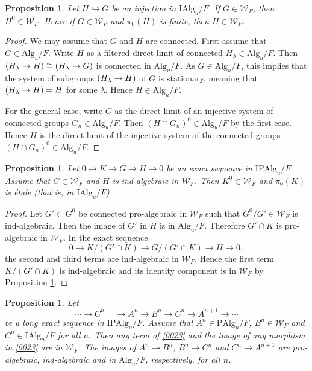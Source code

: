 \documentclass{amsart}
\newtheorem{Prop}[Thm]{Proposition}
\theoremstyle{remark}
\numberwithin{equation}{section}
\newcommand{\into}{\hookrightarrow}
\newcommand{\Alg}{\mathrm{Alg}}
\newcommand{\Ind}{\mathrm{I}}
\newcommand{\Pro}{\mathrm{P}}
\let\Im\relax
\DeclareMathOperator{\Im}{Im}
\begin{document}
\begin{Prop} \label{0048}
	Let $H \into G$ be an injection in $\Ind \Alg_{u} / F$.
	If $G \in \mathcal{W}_{F}$, then $H^{0} \in \mathcal{W}_{F}$.
	Hence if $G \in \mathcal{W}_{F}$ and $\pi_{0}(H)$ is finite,
	then $H \in \mathcal{W}_{F}$.
\end{Prop}

\begin{proof}
	We may assume that $G$ and $H$ are connected.
	First assume that $G \in \Alg_{u} / F$.
	Write $H$ as a filtered direct limit of connected $H_{\lambda} \in \Alg_{u} / F$.
	Then $\Im(H_{\lambda} \to H) \cong \Im(H_{\lambda} \to G)$ is connected in $\Alg_{u} / F$.
	As $G \in \Alg_{u} / F$, this implies that
	the system of subgroups $\Im(H_{\lambda} \to H)$ of $G$ is stationary,
	meaning that $\Im(H_{\lambda} \to H) = H$ for some $\lambda$.
	Hence $H \in \Alg_{u} / F$.
	
	For the general case, write $G$ as the direct limit of an injective system of
	connected groups $G_{n} \in \Alg_{u} / F$.
	Then $(H \cap G_{n})^{0} \in \Alg_{u} / F$ by the first case.
	Hence $H$ is the direct limit of the injective system of
	the connected groups $(H \cap G_{n})^{0} \in \Alg_{u} / F$.
\end{proof}

\begin{Prop} \label{0049}
	Let $0 \to K \to G \to H \to 0$ be an exact sequence in $\Ind \Pro \Alg_{u} / F$.
	Assume that $G \in \mathcal{W}_{F}$ and $H$ is ind-algebraic in $\mathcal{W}_{F}$.
	Then $K^{0} \in \mathcal{W}_{F}$ and $\pi_{0}(K)$ is \'etale
	(that is, in $\Ind \Alg_{u} / F$).
\end{Prop}

\begin{proof}
	Let $G' \subset G^{0}$ be connected pro-algebraic in $\mathcal{W}_{F}$
	such that $G^{0} / G' \in \mathcal{W}_{F}$ is ind-algebraic.
	Then the image of $G'$ in $H$ is in $\Alg_{u} / F$.
	Therefore $G' \cap K$ is pro-algebraic in $\mathcal{W}_{F}$.
	In the exact sequence
		\[
				0
			\to
				K / (G' \cap K)
			\to
				G / (G' \cap K)
			\to
				H
			\to
				0,
		\]
	the second and third terms are ind-algebraic in $\mathcal{W}_{F}$.
	Hence the first term $K / (G' \cap K)$ is ind-algebraic
	and its identity component is in $\mathcal{W}_{F}$
	by Proposition \ref{0048}.
\end{proof}

\begin{Prop} \label{0041}
	Let
		\begin{equation} \label{0023}
				\cdots
			\to
				C^{n - 1}
			\to
				A^{n}
			\to
				B^{n}
			\to
				C^{n}
			\to
				A^{n + 1}
			\to
				\cdots
		\end{equation}
	be a long exact sequence in $\Ind \Pro \Alg_{u} / F$.
	Assume that $A^{n} \in \Pro \Alg_{u} / F$,
	$B^{n} \in \mathcal{W}_{F}$ and
	$C^{n} \in \Ind \Alg_{u} / F$ for all $n$.
	Then any term of \eqref{0023} and the image of any morphism in \eqref{0023} are in $\mathcal{W}_{F}$.
	The images of $A^{n} \to B^{n}$, $B^{n} \to C^{n}$ and $C^{n} \to A^{n + 1}$
	are pro-algebraic, ind-algebraic and in $\Alg_{u} / F$, respectively, for all $n$.
\end{Prop}
\end{document}

